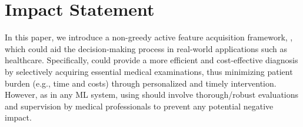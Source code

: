 




\section*{Impact Statement}
In this paper, we introduce a non-greedy active feature acquisition framework, \texttt{\OurMethod}, which could aid the decision-making process in real-world applications such as healthcare. Specifically, \texttt{\OurMethod} could provide a more efficient and cost-effective diagnosis by selectively acquiring essential medical examinations, thus minimizing patient burden (e.g., time and costs) through personalized and timely intervention. However, as in any ML system, using \texttt{\OurMethod} should involve thorough/robust evaluations and supervision by medical professionals to prevent any potential negative impact.






